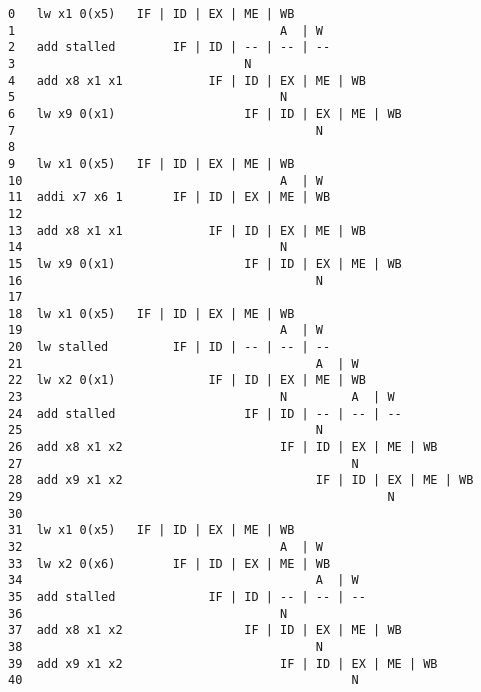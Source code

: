 \documentclass[varwidth]{standalone}
\begin{document}
  \begin{BVerbatim}[]
0   lw x1 0(x5)   IF | ID | EX | ME | WB
1                                     A  | W
2   add stalled        IF | ID | -- | -- | --
3                                N
4   add x8 x1 x1            IF | ID | EX | ME | WB
5                                     N
6   lw x9 0(x1)                  IF | ID | EX | ME | WB
7                                          N
8
9   lw x1 0(x5)   IF | ID | EX | ME | WB
10                                    A  | W
11  addi x7 x6 1       IF | ID | EX | ME | WB
12
13  add x8 x1 x1            IF | ID | EX | ME | WB
14                                    N
15  lw x9 0(x1)                  IF | ID | EX | ME | WB
16                                         N
17
18  lw x1 0(x5)   IF | ID | EX | ME | WB
19                                    A  | W
20  lw stalled         IF | ID | -- | -- | --
21                                         A  | W
22  lw x2 0(x1)             IF | ID | EX | ME | WB
23                                    N         A  | W
24  add stalled                  IF | ID | -- | -- | --
25                                         N
26  add x8 x1 x2                      IF | ID | EX | ME | WB
27                                              N
28  add x9 x1 x2                           IF | ID | EX | ME | WB
29                                                   N
30
31  lw x1 0(x5)   IF | ID | EX | ME | WB
32                                    A  | W
33  lw x2 0(x6)        IF | ID | EX | ME | WB
34                                         A  | W
35  add stalled             IF | ID | -- | -- | --
36                                    N
37  add x8 x1 x2                 IF | ID | EX | ME | WB
38                                         N
39  add x9 x1 x2                      IF | ID | EX | ME | WB
40                                              N
  \end{BVerbatim}
\end{document}

